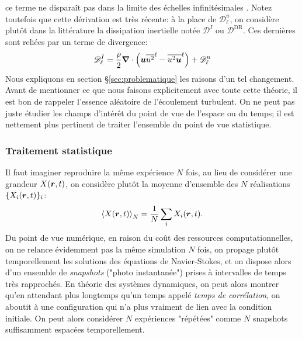 \documentclass[13pt, a4paper]{extarticle}
\newcommand{\filt}[1]{\overline{#1}^\ell}
\begin{document}
ce terme ne disparaît pas dans la limite des échelles infinitésimales \cite{DuchonRobert}. 
Notez toutefois que cette dérivation est très récente: à la place de $\mathscr{D}^{u}_\ell$,
on considère plutôt dans la littérature la dissipation inertielle notée $\mathscr{D}^I$
ou $\mathscr{D}^{\text{DR}}$. Ces dernières sont reliées par un terme de divergence:
\begin{align}
  \mathscr{D}^I_\ell = \dfrac{\rho}{2}\grad\cdot\qty(\git{u}\filt{u^2}-\filt{u^2\git{u}}) 
  + \mathscr{D}^u_\ell
  \label{eq:DI}
\end{align}
Nous expliquons en section \S \ref{sec:problematique} les raisons d'un tel changement. \\
Avant de mentionner ce que nous faisons explicitement avec toute cette théorie, 
il est bon de rappeler l'essence aléatoire de l'écoulement turbulent. On ne peut 
pas juste étudier les champs d'intérêt du point de vue de l'espace ou du temps; 
il est nettement plus pertinent de traiter l'ensemble du point de vue statistique.

\subsubsection{Traitement statistique}\label{sec:outil_turb}
\noindent Il faut imaginer reproduire la même expérience $N$ fois, au lieu de 
considérer une grandeur $X(\boldsymbol{r},t)$, on considère plutôt la moyenne d'ensemble 
des $N$ réalisations $\{X_i(\boldsymbol{r},t)\}_i$:
\begin{align}
    \left\langle X(\boldsymbol{r},t)\right\rangle_N = \dfrac{1}{N}\sum_i X_i(\boldsymbol{r},t).
\end{align}
Du point de vue numérique, en raison du coût des ressources computationnelles, 
on ne relance évidemment pas la même simulation $N$ fois, on propage plutôt 
temporellement les solutions des équations de Navier-Stokes, et on dispose alors 
d'un ensemble de \emph{snapshots} ("photo instantanée") prises à intervalles de 
temps très rapprochés. En théorie des systèmes dynamiques, on peut alors montrer 
qu'en attendant plus longtemps qu'un temps appelé \emph{temps de corrélation}, 
on aboutit à une configuration qui n'a plus vraiment de lien avec la condition 
initiale. On peut alors considérer $N$ expériences "répétées" comme $N$ snapshots 
suffisamment espacées temporellement. \\
\end{document}
